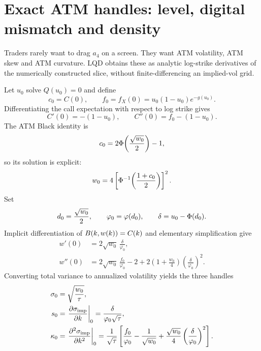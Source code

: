 \documentclass[11pt]{article}
\begin{document}
\section{Exact ATM handles: level, digital mismatch and density}
\label{sec:atm}

Traders rarely want to drag $a_4$ on a screen.  They want ATM volatility, ATM
skew and ATM curvature.  LQD obtains these as analytic log-strike derivatives
of the numerically constructed slice, without finite-differencing an implied-vol
grid.

Let $u_0$ solve $Q(u_0)=0$ and define
\begin{equation}
c_0=C(0),\qquad
f_0=f_X(0)=u_0(1-u_0)e^{-g(u_0)}.
\label{eq:atm_inputs}
\end{equation}
Differentiating the call expectation with respect to log strike gives
\begin{equation}
C'(0)=-(1-u_0),\qquad
C''(0)=f_0-(1-u_0).
\label{eq:call_atm_derivatives}
\end{equation}
The ATM Black identity is
\[
c_0=2\Phi\!\left(\frac{\sqrt{w_0}}{2}\right)-1,
\]
so its solution is explicit:
\begin{equation}
w_0=4\left[
\Phi^{-1}\!\left(\frac{1+c_0}{2}\right)
\right]^2.
\label{eq:w0}
\end{equation}
Set
\begin{equation}
d_0=\frac{\sqrt{w_0}}{2},\qquad
\varphi_0=\varphi(d_0),\qquad
\delta=u_0-\Phi(d_0).
\label{eq:atm_short}
\end{equation}
Implicit differentiation of $B(k,w(k))=C(k)$ and elementary simplification
give
\begin{align}
w'(0)
  &=2\sqrt{w_0}\,\frac{\delta}{\varphi_0}, \label{eq:wprime}\\
w''(0)
  &=2\sqrt{w_0}\,\frac{f_0}{\varphi_0}-2
    +2\left(1+\frac{w_0}{4}\right)
       \left(\frac{\delta}{\varphi_0}\right)^2.
\label{eq:wsecond}
\end{align}
Converting total variance to annualized volatility yields the three handles
\begin{align}
\sigma_0
  &=\sqrt{\frac{w_0}{\tau}}, \label{eq:sigma0}\\
s_0
  &=\left.\frac{\partial\sigma_{\rm imp}}{\partial k}\right|_{0}
   =\frac{\delta}{\varphi_0\sqrt{\tau}}, \label{eq:skew0}\\
\kappa_0
  &=\left.\frac{\partial^2\sigma_{\rm imp}}{\partial k^2}\right|_{0}
   =\frac{1}{\sqrt{\tau}}\left[
      \frac{f_0}{\varphi_0}-\frac{1}{\sqrt{w_0}}
      +\frac{\sqrt{w_0}}{4}
       \left(\frac{\delta}{\varphi_0}\right)^2
     \right].
\label{eq:curv0}
\end{align}
\end{document}
